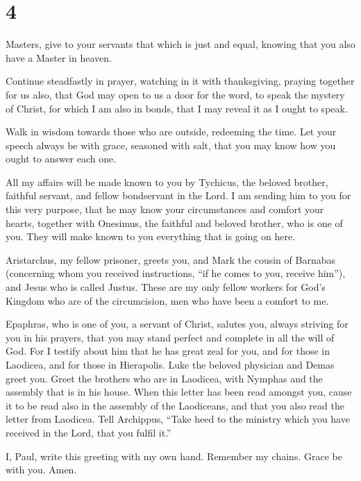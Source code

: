 \hypertarget{section-3}{%
\section{4}\label{section-3}}

 Masters, give to your servants that which is just and
equal, knowing that you also have a Master in heaven.

 Continue steadfastly in prayer, watching in it with
thanksgiving,  praying together for us also, that God may
open to us a door for the word, to speak the mystery of Christ, for
which I am also in bonds,  that I may reveal it as I ought
to speak.

 Walk in wisdom towards those who are outside, redeeming
the time.  Let your speech always be with grace, seasoned
with salt, that you may know how you ought to answer each one.

 All my affairs will be made known to you by Tychicus, the
beloved brother, faithful servant, and fellow bondservant in the Lord.
 I am sending him to you for this very purpose, that he
may know your circumstances and comfort your hearts, 
together with Onesimus, the faithful and beloved brother, who is one of
you. They will make known to you everything that is going on here.

 Aristarchus, my fellow prisoner, greets you, and Mark
the cousin of Barnabas (concerning whom you received instructions, ``if
he comes to you, receive him''),  and Jesus who is called
Justus. These are my only fellow workers for God's Kingdom who are of
the circumcision, men who have been a comfort to me.

 Epaphras, who is one of you, a servant of Christ,
salutes you, always striving for you in his prayers, that you may stand
perfect and complete in all the will of God.  For I
testify about him that he has great zeal for you, and for those in
Laodicea, and for those in Hierapolis.  Luke the beloved
physician and Demas greet you.  Greet the brothers who
are in Laodicea, with Nymphas and the assembly that is in his house.
 When this letter has been read amongst you, cause it to
be read also in the assembly of the Laodiceans, and that you also read
the letter from Laodicea.  Tell Archippus, ``Take heed to
the ministry which you have received in the Lord, that you fulfil it.''

 I, Paul, write this greeting with my own hand. Remember
my chains. Grace be with you. Amen.
